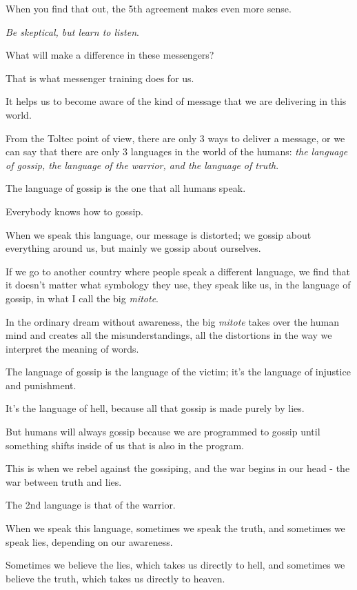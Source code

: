 \documentclass{article}
\numberwithin{equation}{section}
\begin{document}
When you find that out, the 5th agreement makes even more sense.

\textit{Be skeptical, but learn to listen}.

What will make a difference in these messengers?


That is what messenger training does for us.

It helps us to become aware of the kind of message that we are delivering in this world.

%
From the Toltec point of view, there are only 3 ways to deliver a message, or we can say that there are only 3 languages in the world of the humans: \textit{the language of gossip, the language of the warrior, and the language of truth}.

%
The language of gossip is the one that all humans speak.

Everybody knows how to gossip.

When we speak this language, our message is distorted; we gossip about everything around us, but mainly we gossip about ourselves.

If we go to another country where people speak a different language, we find that it doesn't matter what symbology they use, they speak like us, in the language of gossip, in what I call the big \textit{mitote}.

In the ordinary dream without awareness, the big \textit{mitote} takes over the human mind and creates all the misunderstandings, all the distortions in the way we interpret the meaning of words.

%
The language of gossip is the language of the victim; it's the language of injustice and punishment.

It's the language of hell, because all that gossip is made purely by lies.

But humans will always gossip because we are programmed to gossip until something shifts inside of us that is also in the program.

This is when we rebel against the gossiping, and the war begins in our head - the war between truth and lies.

%
The 2nd language is that of the warrior.

When we speak this language, sometimes we speak the truth, and sometimes we speak lies, depending on our awareness.

Sometimes we believe the lies, which takes us directly to hell, and sometimes we believe the truth, which takes us directly to heaven.
\end{document}
